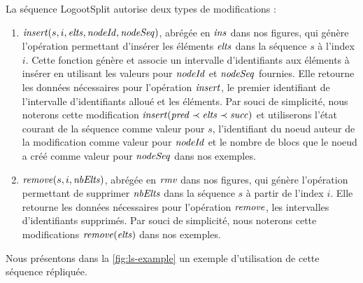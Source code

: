 La séquence LogootSplit autorise deux types de modifications :
\begin{enumerate}
  \item $\mathit{insert}(s, i, \mathit{elts}, \mathit{nodeId}, \mathit{nodeSeq})$, abrégée en $\mathit{ins}$ dans nos figures, qui génère l'opération permettant d'insérer les éléments $\mathit{elts}$ dans la séquence $s$ à l'index $i$.
    Cette fonction génère et associe un intervalle d'identifiants aux éléments à insérer en utilisant les valeurs pour $\mathit{nodeId}$ et $\mathit{nodeSeq}$ fournies.
    Elle retourne les données nécessaires pour l'opération $\mathit{insert}$, \ie le premier identifiant de l'intervalle d'identifiants alloué et les éléments.
    Par souci de simplicité, nous noterons cette modification $\mathit{insert}(\mathit{pred} \prec \mathit{elts} \prec \mathit{succ})$ et utiliserons l'état courant de la séquence comme valeur pour $s$, l'identifiant du noeud auteur de la modification comme valeur pour $\mathit{nodeId}$ et le nombre de blocs que le noeud a créé comme valeur pour $\mathit{nodeSeq}$ dans nos exemples.
  \item  $\mathit{remove}(s, i, \mathit{nbElts})$, abrégée en $\mathit{rmv}$ dans nos figures, qui génère l'opération permettant de supprimer $\mathit{nbElts}$ dans la séquence $s$ à partir de l'index $i$.
    Elle retourne les données nécessaires pour l'opération $\mathit{remove}$, \ie les intervalles d'identifiants supprimés.
    Par souci de simplicité, nous noterons cette modifications $\mathit{remove}(\mathit{elts})$ dans nos exemples.
\end{enumerate}

Nous présentons dans la \autoref{fig:ls-example} un exemple d'utilisation de cette séquence répliquée.


